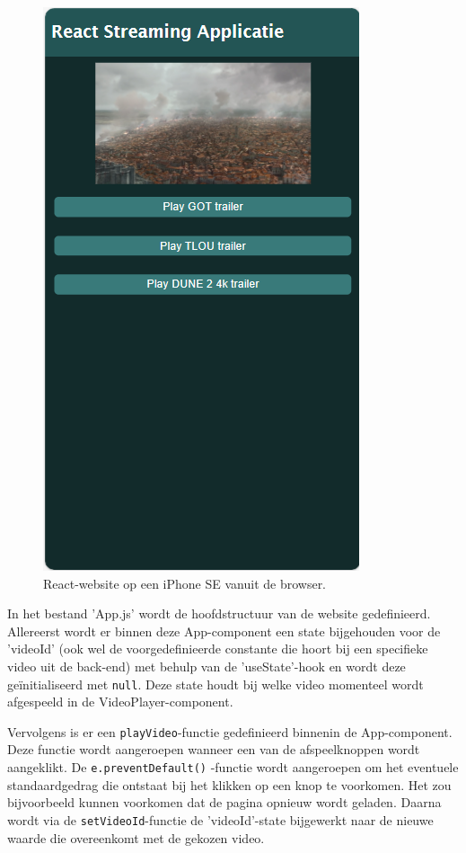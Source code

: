 \begin{figure}
  \centering
  \includegraphics[width=0.7\linewidth]{img/ReactWebsiteIphone}
  \caption{React-website op een iPhone SE vanuit de browser.}
  \label{fig:React-website op een iPhone SE vanuit de browser}
\end{figure}

In het bestand 'App.js' wordt de hoofdstructuur van de website gedefinieerd. Allereerst wordt er binnen deze App-component een state bijgehouden voor de 'videoId' (ook wel de voorgedefinieerde constante die hoort bij een specifieke video uit de back-end) met behulp van de 'useState'-hook en wordt deze geïnitialiseerd met \verb|null|. Deze state houdt bij welke video momenteel wordt afgespeeld in de VideoPlayer-component.

Vervolgens is er een \verb|playVideo|-functie gedefinieerd binnenin de App-component. Deze functie wordt aangeroepen wanneer een van de afspeelknoppen wordt aangeklikt. De \verb|e.preventDefault()| -functie wordt aangeroepen om het eventuele standaardgedrag die ontstaat bij het klikken op een knop te voorkomen. Het zou bijvoorbeeld kunnen voorkomen dat de pagina opnieuw wordt geladen. Daarna wordt via de \verb|setVideoId|-functie de 'videoId'-state bijgewerkt naar de nieuwe waarde die overeenkomt met de gekozen video.

